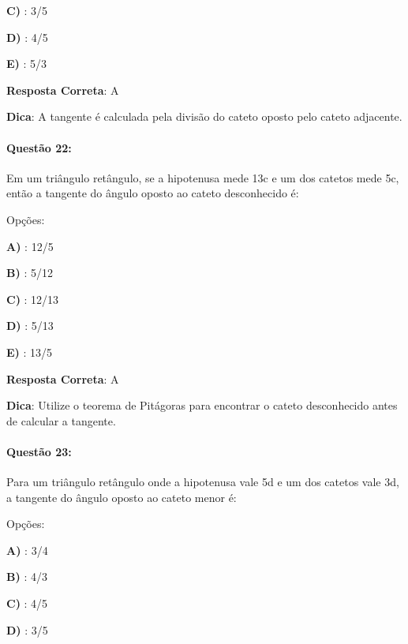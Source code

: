 \documentclass{article}
\begin{document}
\textbf{C) }: 3/5 

\textbf{D) }: 4/5 

\textbf{E) }: 5/3 

\vspace{\baselineskip}\textbf{Resposta Correta}: A

\vspace{\baselineskip}\textbf{Dica}: A tangente é calculada pela divisão do cateto oposto pelo cateto adjacente.

\paragraph{Questão 22:}
{Em um triângulo retângulo, se a hipotenusa mede 13c e um dos catetos mede 5c, então a tangente do ângulo oposto ao cateto desconhecido é:}

\vspace{\baselineskip}Opções:

\vspace{\baselineskip}\textbf{A) }: 12/5 

\textbf{B) }: 5/12 

\textbf{C) }: 12/13 

\textbf{D) }: 5/13 

\textbf{E) }: 13/5 

\vspace{\baselineskip}\textbf{Resposta Correta}: A

\vspace{\baselineskip}\textbf{Dica}: Utilize o teorema de Pitágoras para encontrar o cateto desconhecido antes de calcular a tangente.

\paragraph{Questão 23:}
{Para um triângulo retângulo onde a hipotenusa vale 5d e um dos catetos vale 3d, a tangente do ângulo oposto ao cateto menor é:}

\vspace{\baselineskip}Opções:

\vspace{\baselineskip}\textbf{A) }: 3/4 

\textbf{B) }: 4/3 

\textbf{C) }: 4/5 

\textbf{D) }: 3/5 
\end{document}
